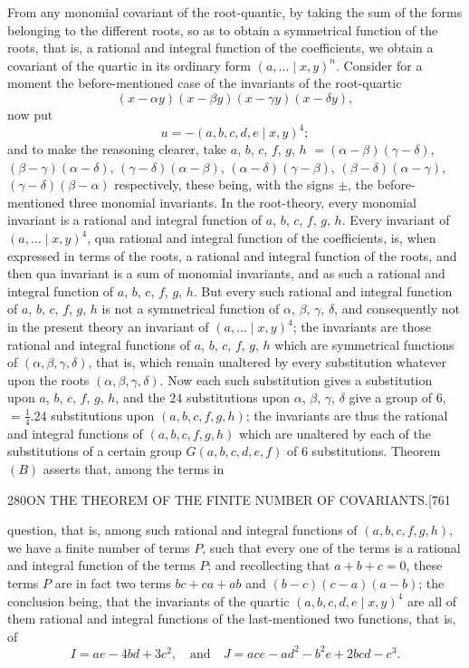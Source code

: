 \documentclass[11pt]{article}
\begin{document}
From any monomial covariant of the root-quantic, by taking the sum of the
forms belonging to the different roots, so as to obtain a symmetrical
function of the roots, that is, a rational and integral function of the
coefficients, we obtain a covariant of the quartic in its ordinary form
$(a, \ldots \mid x, y)^{n}$. Consider for a moment the before-mentioned case
of the invariants of the root-quartic
\[
  (x - \alpha y)(x - \beta y)(x - \gamma y)(x - \delta y),
\]
now put
\[
  u = -(a, b, c, d, e \mid x, y)^{4};
\]
and to make the reasoning clearer, take $a$, $b$, $c$, $f$, $g$, $h$
$= (\alpha - \beta)(\gamma - \delta)$, $(\beta - \gamma)(\alpha - \delta)$,
$(\gamma - \delta)(\alpha - \beta)$, $(\alpha - \delta)(\gamma - \beta)$,
$(\beta - \delta)(\alpha - \gamma)$, $(\gamma - \delta)(\beta - \alpha)$
respectively, these being, with the signs $\pm$, the before-mentioned three
monomial invariants. In the root-theory, every monomial invariant is a
rational and integral function of $a$, $b$, $c$, $f$, $g$, $h$. Every
invariant of $(a, \ldots \mid x, y)^{4}$, qua rational and integral function
of the coefficients, is, when expressed in terms of the roots, a rational
and integral function of the roots, and then qua invariant is a sum of
monomial invariants, and as such a rational and integral function of $a$,
$b$, $c$, $f$, $g$, $h$. But every such rational and integral function of
$a$, $b$, $c$, $f$, $g$, $h$ is not a symmetrical function of $\alpha$,
$\beta$, $\gamma$, $\delta$, and consequently not in the present theory an
invariant of $(a, \ldots \mid x, y)^{4}$; the invariants are those rational
and integral functions of $a$, $b$, $c$, $f$, $g$, $h$ which are symmetrical
functions of $(\alpha, \beta, \gamma, \delta)$, that is, which remain
unaltered by every substitution whatever upon the roots $(\alpha, \beta,
\gamma, \delta)$. Now each such substitution gives a substitution upon $a$,
$b$, $c$, $f$, $g$, $h$, and the $24$ substitutions upon $\alpha$, $\beta$,
$\gamma$, $\delta$ give a group of $6$, $= \tfrac{1}{4} . 24$ substitutions
upon $(a, b, c, f, g, h)$; the invariants are thus the rational and integral
functions of $(a, b, c, f, g, h)$ which are unaltered by each of the
substitutions of a certain group $G(a, b, c, d, e, f)$ of $6$ substitutions.
Theorem $(B)$ asserts that, among the terms in

\newpage
\begin{center}\small 280\quad ON THE THEOREM OF THE FINITE NUMBER OF COVARIANTS.\hfill [761\end{center}
\noindent
question, that is, among such rational and integral functions of $(a, b, c,
f, g, h)$, we have a finite number of terms $P$, such that every one of the
terms is a rational and integral function of the terms $P$; and recollecting
that $a + b + c = 0$, these terms $P$ are in fact two terms $bc + ca + ab$
and $(b - c)(c - a)(a - b)$; the conclusion being, that the invariants of
the quartic $(a, b, c, d, e \mid x, y)^{4}$ are all of them rational and
integral functions of the last-mentioned two functions, that is, of
\[
  I = ae - 4bd + 3c^{2}, \quad\text{and}\quad
  J = ace - ad^{2} - b^{2}e + 2bcd - c^{3}.
\]
\end{document}
